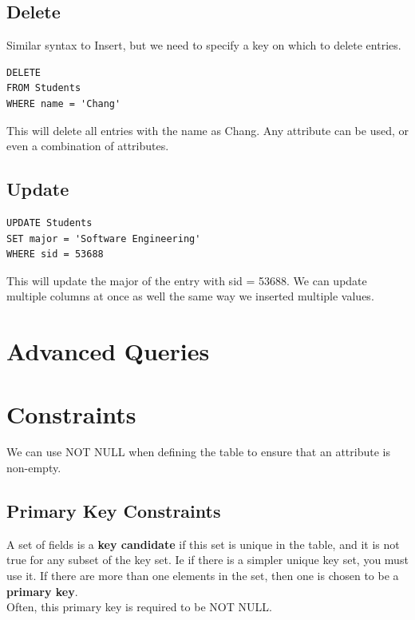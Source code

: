 \documentclass[12pt]{article}
\theoremstyle{definition}
\begin{document}
\subsection{Delete}
Similar syntax to Insert, but we need to specify a key on which to delete entries. 
\\ \linebreak
\begin{lstlisting}
DELETE
FROM Students
WHERE name = 'Chang'
\end{lstlisting}
This will delete all entries with the name as Chang. Any attribute can be used, or even a combination of attributes. 

\subsection{Update}
\begin{lstlisting}
UPDATE Students
SET major = 'Software Engineering'
WHERE sid = 53688
\end{lstlisting}
This will update the major of the entry with sid = 53688. We can update multiple columns at once as well the same way we inserted multiple values.

\section{Advanced Queries}

\section{Constraints}
We can use NOT NULL when defining the table to ensure that an attribute is non-empty.
\\ \linebreak
\subsection{Primary Key Constraints}
A set of fields is a \textbf{key candidate} if this set is unique in the table, and it is not true for any subset of the key set. Ie if there is a simpler unique key set, you must use it. If there are more than one elements in the set, then one is chosen to be a \textbf{primary key}.
\\ \linebreak
Often, this primary key is required to be NOT NULL. 
\end{document}
